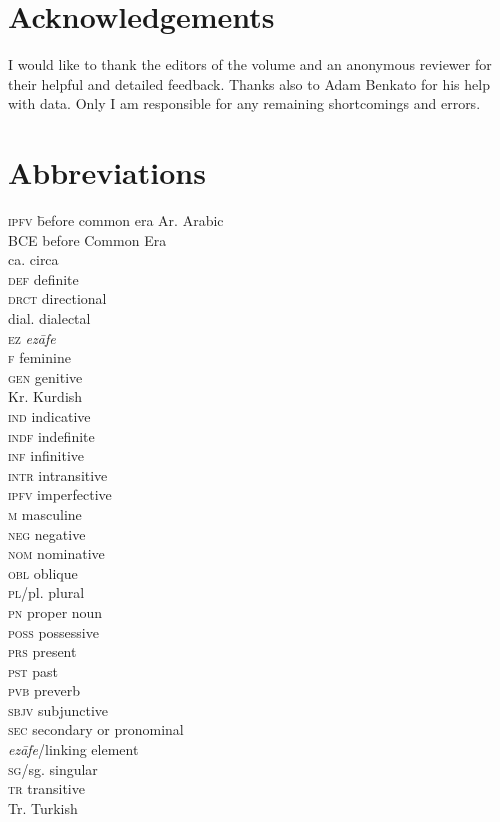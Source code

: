 \documentclass[output=paper]{langsci/langscibook}
\begin{document}
\section*{Acknowledgements}
I would like to thank the editors of the volume and an anonymous reviewer for their helpful and detailed feedback. Thanks also to Adam Benkato for his help with  data. Only I am responsible for any remaining shortcomings and errors. 

\section*{Abbreviations}
\begin{multicols}{2}
\begin{tabbing}
\textsc{ipfv} \hspace{1em} \= before common era\kill
Ar.              \> {Arabic}\\
BCE             \> before Common Era\\
ca.             \> circa\\
\textsc{def}    \> {definite} \\
\textsc{drct}   \> directional\\
dial.           \> dialectal \\
\textsc{ez}     \> \textit{ezāfe} \\
\textsc{f}      \> feminine \\
\textsc{gen}    \> genitive\\
Kr.             \> Kurdish\\
\textsc{ind}    \> indicative \\
\textsc{indf}   \> indefinite \\
\textsc{inf}    \> {infinitive}\\
\textsc{intr}   \> intransitive\\
\textsc{ipfv}   \> imperfective \\
\textsc{m}      \> masculine \\
\textsc{neg}    \> negative\\
\textsc{nom}    \> nominative\\
\textsc{obl}    \> oblique\\
\textsc{pl/}pl. \> plural \\
\textsc{pn}     \> proper noun\\
\textsc{poss}   \> possessive \\
\textsc{prs}    \> present \\
\textsc{pst}    \> past \\
\textsc{pvb}    \> preverb\\
\textsc{sbjv}   \> subjunctive \\
\textsc{sec}    \> secondary or pronominal \\ \> \textit{ezāfe}/linking element\\
\textsc{sg/}sg. \> singular\\
\textsc{tr}     \> transitive\\
Tr.             \> {Turkish}
\end{tabbing}
\end{multicols}


{\sloppy\printbibliography[heading=subbibliography,notkeyword=this]}
\end{document}
